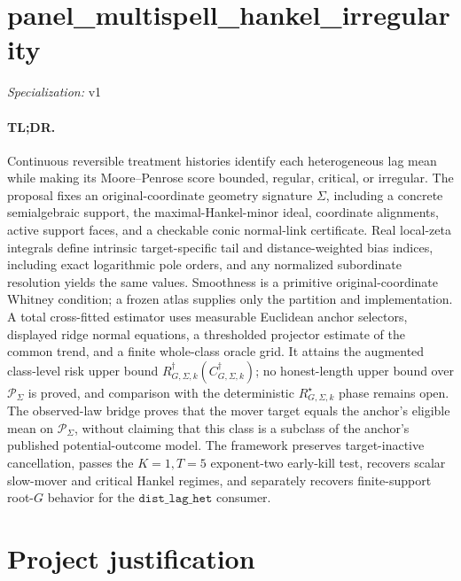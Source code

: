 \documentclass{article}
\begin{document}
\sloppy

\section*{panel\_\allowbreak{}multispell\_\allowbreak{}hankel\_\allowbreak{}irregularity}

\noindent\textit{Specialization:} v1\par

\paragraph{TL;DR.} Continuous reversible treatment histories identify each heterogeneous lag mean while making its Moore--Penrose score bounded, regular, critical, or irregular. The proposal fixes an original-coordinate geometry signature \(\Sigma\), including a concrete semialgebraic support, the maximal-Hankel-minor ideal, coordinate alignments, active support faces, and a checkable conic normal-link certificate. Real local-zeta integrals define intrinsic target-specific tail and distance-weighted bias indices, including exact logarithmic pole orders, and any normalized subordinate resolution yields the same values. Smoothness is a primitive original-coordinate Whitney condition; a frozen atlas supplies only the partition and implementation. A total cross-fitted estimator uses measurable Euclidean anchor selectors, displayed ridge normal equations, a thresholded projector estimate of the common trend, and a finite whole-class oracle grid. It attains the augmented class-level risk upper bound \(R_{G,\Sigma,k}^{\dagger}(C_{G,\Sigma,k}^{\dagger})\); no honest-length upper bound over \(\mathcal P_\Sigma\) is proved, and comparison with the deterministic \(R_{G,\Sigma,k}^{\star}\) phase remains open. The observed-law bridge proves that the mover target equals the anchor's eligible mean on \(\mathcal P_\Sigma\), without claiming that this class is a subclass of the anchor's published potential-outcome model. The framework preserves target-inactive cancellation, passes the \(K=1,T=5\) exponent-two early-kill test, recovers scalar slow-mover and critical Hankel regimes, and separately recovers finite-support root-\(G\) behavior for the \(\texttt{dist\_lag\_het}\) consumer.

\section{Project justification}
\end{document}
